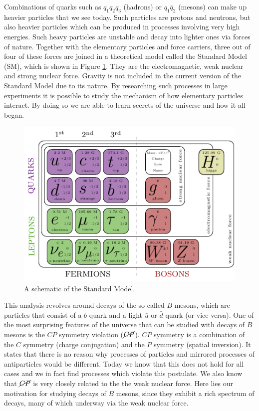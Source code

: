 \documentclass[  headings=standardclasses,
  headings=big,oneside,a4paper,openany,12pt]{scrbook}
\begin{document}
Combinations of quarks such as $q_1 q_2 q_3$ (hadrons) or $q_1 \bar{q}_2$ (mesons) can make up heavier particles that we see today. Such particles are protons and neutrons, but also heavier particles which can be produced in processes involving very high energies. Such heavy particles are unstable and decay into lighter ones via forces of nature. Together with the elementary particles and force carriers, three out of four of these forces are joined in a theoretical model called the Standard Model (SM), which is shown in Figure \ref{fig:sm}. They are the electromagnetic, weak nuclear and strong nuclear force. Gravity is not included in the current version of the Standard Model due to its nature. By researching such processes in large experiments it is possible to study the mechanism of how elementary particles interact. By doing so we are able to learn secrets of the universe and how it all began.

\begin{figure}[H]
\centering
\includegraphics[scale=1.6]{texfig/SM}
\captionsetup{width=.8\linewidth}
\caption{A schematic of the Standard Model.}
\label{fig:sm}
\end{figure}

This analysis revolves around decays of the so called $B$ mesons, which are particles that consist of a $b$ quark and a light $\bar u$ or $\bar d$ quark (or vice-versa). One of the most surprising features of the universe that can be studied with decays of $B$ mesons is the $CP$ symmetry violation ($\cancel{CP}$). $CP$ symmetry is a combination of the $C$ symmetry (charge conjugation) and the $P$ symmetry (spatial inversion). It states that there is no reason why processes of particles and mirrored processes of antiparticles would be different. Today we know that this does not hold for all cases and we in fact find processes which violate this postulate. We also know that $\cancel{CP}$ is very closely related to the the weak nuclear force. Here lies our motivation for studying decays of $B$ mesons, since they exhibit a rich spectrum of decays, many of which underway via the weak nuclear force.
\end{document}
